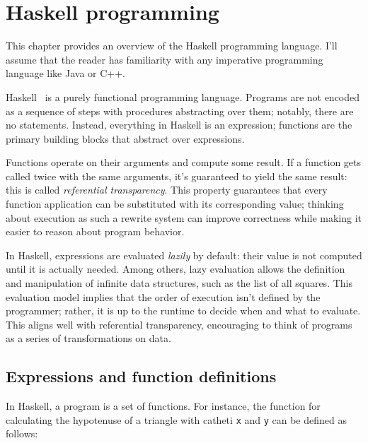 \documentclass[UdineBachThesis,american,11pt]{PhdThesis}
\begin{document}
  \frontmatter

  \tableofcontents

  \mainmatter

  \pagestyle{serif}

  \chapter{Haskell programming}

  This chapter provides an overview of the Haskell programming language. I'll
  assume that the reader has familiarity with any imperative programming
  language like Java or C++.

  Haskell~\autocite{haskell} is a purely functional programming language.
  Programs are not encoded as a sequence of steps with procedures abstracting
  over them; notably, there are no statements. Instead, everything in Haskell is
  an expression; functions are the primary building blocks that abstract over
  expressions.

  Functions operate on their arguments and compute some result. If a function
  gets called twice with the same arguments, it's guaranteed to yield the same
  result: this is called \emph{referential transparency}. This property
  guarantees that every function application can be substituted with its
  corresponding value; thinking about execution as such a rewrite system can
  improve correctness while making it easier to reason about program behavior.

  In Haskell, expressions are evaluated \emph{lazily} by default: their value is
  not computed until it is actually needed. Among others, lazy evaluation allows
  the definition and manipulation of infinite data structures, such as the list
  of all squares. This evaluation model implies that the order of execution
  isn't defined by the programmer; rather, it is up to the runtime to decide
  when and what to evaluate. This aligns well with referential transparency,
  encouraging to think of programs as a series of transformations on data.

  \section{Expressions and function definitions}

  In Haskell, a program is a set of functions. For instance, the function for
  calculating the hypotenuse of a triangle with catheti \texttt{x} and
  \texttt{y} can be defined as follows:
\end{document}

